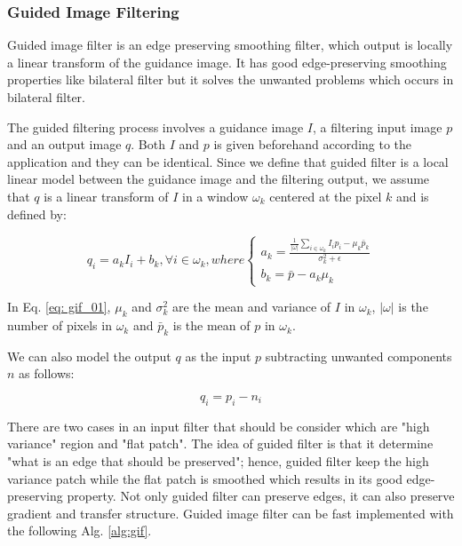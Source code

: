 \subsubsection{Guided Image Filtering}
Guided image filter \cite{He2013} is an edge preserving smoothing filter, which output is locally a linear transform of the guidance image. It has good edge-preserving smoothing properties like bilateral filter but it solves the unwanted problems which occurs in bilateral filter.

The guided filtering process involves a guidance image $I$, a filtering input image $p$ and an output image $q$. Both $I$ and $p$ is given beforehand according to the application and they can be identical. Since we define that guided filter is a local linear model between the guidance image and the filtering output, we assume that $q$ is a linear transform of $I$ in a window $\omega_{k}$ centered at the pixel $k$ and is defined by:

\begin{equation}\label{eq: gif_01}
q_{i}=a_{k}I_{i}+b_{k},\forall i\in \omega_{k}, where 
\left\{\begin{matrix}
a_{k}=\frac{\frac{1}{\left |\omega\right |}\sum_{i\in \omega_{k}}{I_{i}p_{i}-\mu _{k}\bar{p}_{k}}}{\sigma_{k}^2+\epsilon}
\\ 
b_{k}=\bar{p}-a_{k}\mu_{k}
\end{matrix}\right.
\end{equation}

In Eq. \ref{eq: gif_01}, $\mu_{k}$ and $\sigma_{k}^2$ are the mean and variance of $I$ in $\omega_{k}$, $\left |  \omega \right|$ is the number of pixels in $\omega_{k}$ and $\bar{p}_{k}$ is the mean of $p$ in $\omega_{k}$.

We can also model the output $q$ as the input $p$ subtracting unwanted components $n$ as follows: 

\begin{equation}
q_{i}=p_{i}-n_{i}
\end{equation}

There are two cases in an input filter that should be consider which are "high variance" region and "flat patch". The idea of guided filter is that it determine "what is an edge that should be preserved"; hence, guided filter keep the high variance patch while the flat patch is smoothed which results in its good edge-preserving property.  Not only guided filter can preserve edges, it can also preserve gradient and transfer structure. Guided image filter can be fast implemented with the following Alg. \ref{alg:gif}.


